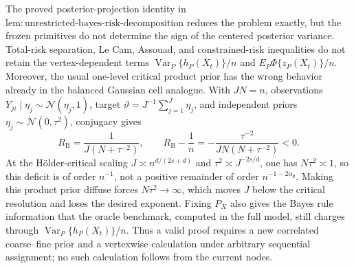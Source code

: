 The proved posterior-projection identity in \(\mathrm{lem{:}unrestricted\text{-}bayes\text{-}risk\text{-}decomposition}\) reduces the problem exactly, but the frozen primitives do not determine the sign of the centered posterior variance.  Total-risk separation, Le Cam, Assouad, and constrained-risk inequalities do not retain the vertex-dependent terms \(\operatorname{Var}_P\{h_P(X_t)\}/n\) and \(E_P\Phi\{z_P(X_t)\}/n\).  Moreover, the usual one-level critical product prior has the wrong behavior already in the balanced Gaussian cell analogue.  With \(J N=n\), observations \(Y_{ji}\mid\eta_j\sim\mathcal N(\eta_j,1)\), target \(\vartheta=J^{-1}\sum_{j=1}^J\eta_j\), and independent priors \(\eta_j\sim\mathcal N(0,\tau^2)\), conjugacy gives
\[
R_{\mathrm B}=\frac{1}{J(N+\tau^{-2})},
\qquad
R_{\mathrm B}-\frac1n
=-\frac{\tau^{-2}}{JN(N+\tau^{-2})}<0.
\]
At the Hölder-critical scaling \(J\asymp n^{d/(2s+d)}\) and \(\tau^2\asymp J^{-2s/d}\), one has \(N\tau^2\asymp1\), so this deficit is of order \(n^{-1}\), not a positive remainder of order \(n^{-1-2\alpha_d}\).  Making this product prior diffuse forces \(N\tau^2\to\infty\), which moves \(J\) below the critical resolution and loses the desired exponent.  Fixing \(P_X\) also gives the Bayes rule information that the oracle benchmark, computed in the full model, still charges through \(\operatorname{Var}_P\{h_P(X_t)\}/n\).  Thus a valid proof requires a new correlated coarse--fine prior and a vertexwise calculation under arbitrary sequential assignment; no such calculation follows from the current nodes.